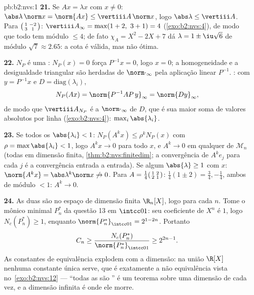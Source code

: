\begin{solution}{pb:b2:nvs:1}
\textbf{21.} Se $Ax = \lambda x$ com $x \neq 0$:
$\abs\lambda\,\norm x = \norm{Ax} \leq \vertiii A\,\norm x$,
logo $\abs\lambda \leq \vertiii A$. Para
$\begin{psmallmatrix}1 & -2\\ 3 & 1\end{psmallmatrix}$:
$\vertiii A_\infty = \max(1 + 2,\ 3 + 1) = 4$
(\cref{exo:b2:nvs:4}), de modo que todo  tem módulo $\leq
4$; de fato $\chi_A = X^2 - 2X + 7$ dá $\lambda = 1 \pm
\iu\sqrt6$ de módulo $\sqrt7 \approx 2.65$: a cota é
válida, mas não ótima.

\textbf{22.} $N_P$ é uma : $N_P(x) = 0$ força $P^{-1}x = 0$,
logo $x = 0$; a homogeneidade e a desigualdade triangular são herdadas
de $\norm\cdot_\infty$ pela aplicação linear $P^{-1}$. : com $y = P^{-1}x$ e $D = \mathrm{diag}(\lambda_i)$,
\[
N_P(Ax) = \norm{P^{-1}AP\,y}_\infty = \norm{Dy}_\infty,
\]
de modo que $\vertiii A_{N_P}$ é a  $\norm\cdot_\infty$
de $D$, que é sua maior soma de valores absolutos por linha
(\cref{exo:b2:nvs:4}): $\max_i\abs{\lambda_i}$.

\textbf{23.} Se todos os $\abs{\lambda_i} < 1$: $N_P(A^kx) \leq
\rho^kN_P(x)$ com $\rho = \max\abs{\lambda_i} < 1$, logo $A^kx
\to 0$ para todo $x$, e $A^k \to 0$ em qualquer  de
$\mathcal{M}_n$ (todas  em dimensão finita,
\cref{thm:b2:nvs:finitedim}; a convergência de $A^ke_j$ para cada
$j$ é a convergência entrada a entrada). Se algum $\abs{\lambda} \geq 1$
com  $x$: $\norm{A^kx} = \abs\lambda^k\norm x
\not\to 0$. Para $A = \frac14\begin{psmallmatrix}1 & 2\\ 2 &
1\end{psmallmatrix}$:  $\frac14(1 \pm 2) =
\frac34, -\frac14$, ambos de módulo $< 1$: $A^k \to 0$.

\textbf{24.} As duas são  no espaço de dimensão finita
$\R_n[X]$, logo  para cada $n$. Tome o mônico
minimal $P^*_n$ da questão 13 em $\intcc01$: seu coeficiente de
$X^n$ é $1$, logo $N_c(P^*_n) \geq 1$, enquanto
$\norm{P^*_n}_{\intcc01} = 2^{1-2n}$. Portanto
\[
C_n \geq \frac{N_c(P^*_n)}{\norm{P^*_n}_{\intcc01}}
\geq 2^{2n-1} .
\]
As constantes de equivalência explodem com a dimensão: na
união $\R[X]$ nenhuma constante única serve, que é exatamente a
não equivalência vista no~\cref{exo:b2:nvs:12} --- ``todas as 
são '' é um teorema sobre uma dimensão de cada vez,
e a dimensão infinita é onde ele morre.


\end{solution}
